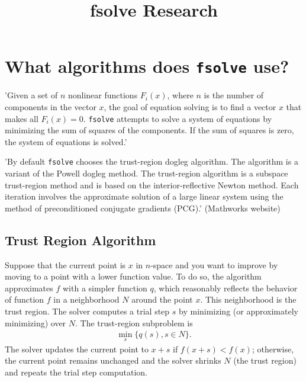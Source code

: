 \documentclass[11pt, a4paper]{article}
\title{fsolve Research}
\date{}
\theoremstyle{definition}
\begin{document}
	
\maketitle

\section{What algorithms does \texttt{fsolve} use?}
'Given a set of $n$ nonlinear functions $F_i(x)$, where $n$ is the number of components in the vector $x$, the goal of equation solving is to find a vector $x$ that makes all $F_i(x) = 0$. \texttt{fsolve} attempts to solve a system of equations by minimizing the sum of squares of the components. If the sum of squares is zero, the system of equations is solved.'

'By default \texttt{fsolve} chooses the trust-region dogleg algorithm. The algorithm is a variant of the Powell dogleg method.
The trust-region algorithm is a subspace trust-region method and is based on the interior-reflective Newton method. Each iteration involves the approximate solution of a large linear system using the method of preconditioned conjugate gradients (PCG).' (Mathworks website)

\subsection{Trust Region Algorithm}
Suppose that the current point is $x$ in $n$-space and you want to improve by moving to a point with a lower function value. To do so, the algorithm approximates $f$ with a simpler function $q$, which reasonably reflects the behavior of function $f$ in a neighborhood $N$ around the point $x$. This neighborhood is the trust region. The solver computes a trial step $s$ by minimizing (or approximately minimizing) over $N$. The trust-region subproblem is
\begin{align*}
\min_s \{q(s), s \in N \}.
\end{align*}
The solver updates the current point to $ x + s$ if $f(x + s) < f(x)$; otherwise, the current point remains unchanged and the solver shrinks $N$ (the trust region) and repeats the trial step computation.
\end{document}
